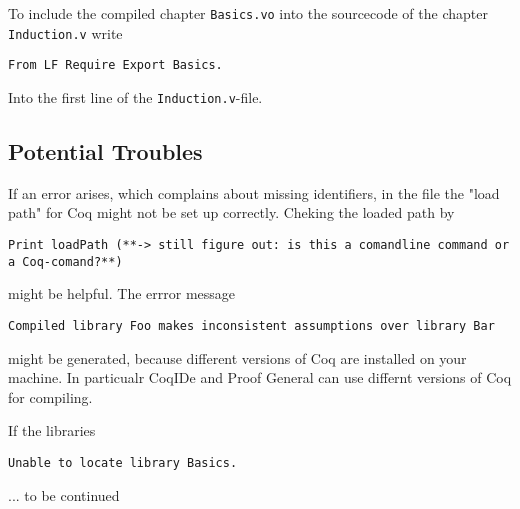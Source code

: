 To include the compiled chapter \texttt{Basics.vo} into the sourcecode of the chapter \texttt{Induction.v} write
\begin{lstlisting}
From LF Require Export Basics.
\end{lstlisting}
Into the first line of the \texttt{Induction.v}-file.

 

\subsection{Potential Troubles}

If an error arises, which complains about missing identifiers, in the file the "load path" for Coq might not be set up correctly.
Cheking the loaded path by
\begin{lstlisting}
Print loadPath (**-> still figure out: is this a comandline command or a Coq-comand?**) 
\end{lstlisting} 
might be helpful. The errror message
\begin{lstlisting}
Compiled library Foo makes inconsistent assumptions over library Bar
\end{lstlisting}
might be generated, because different versions of Coq are installed on your machine.
In particualr  CoqIDe and Proof General can use differnt versions of Coq for compiling.

If the libraries 
\begin{lstlisting}
Unable to locate library Basics.
\end{lstlisting}

 ... to be continued
 
 
 



 

 

